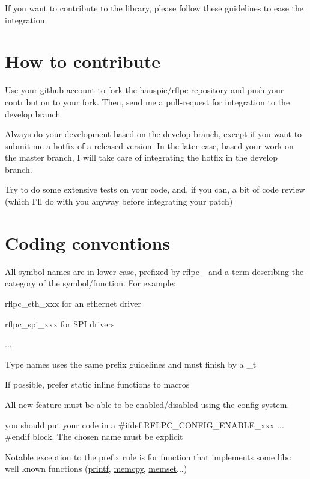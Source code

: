 If you want to contribute to the library, please follow these guidelines to ease the integration\hypertarget{guidelines_contribute}{}\section{How to contribute}\label{guidelines_contribute}

\begin{DoxyItemize}
\item Use your github account to fork the {\ttfamily hauspie/rflpc} repository and push your contribution to your fork. Then, send me a pull-\/request for integration to the {\ttfamily develop} branch
\item Always do your development based on the {\ttfamily develop} branch, except if you want to submit me a hotfix of a released version. In the later case, based your work on the master branch, I will take care of integrating the hotfix in the {\ttfamily develop} branch.
\item Try to do some extensive tests on your code, and, if you can, a bit of code review (which I'll do with you anyway before integrating your patch)
\end{DoxyItemize}\hypertarget{guidelines_conventions}{}\section{Coding conventions}\label{guidelines_conventions}

\begin{DoxyItemize}
\item All symbol names are in lower case, prefixed by {\ttfamily rflpc\-\_\-} and a term describing the category of the symbol/function. For example\-:
\begin{DoxyItemize}
\item {\ttfamily rflpc\-\_\-eth\-\_\-xxx} for an ethernet driver
\item {\ttfamily rflpc\-\_\-spi\-\_\-xxx} for S\-P\-I drivers
\item ...
\end{DoxyItemize}
\item Type names uses the same prefix guidelines and must finish by a {\ttfamily \-\_\-t} 
\item If possible, prefer static inline functions to macros
\item All new feature must be able to be enabled/disabled using the config system.
\begin{DoxyItemize}
\item you should put your code in a {\ttfamily \#ifdef R\-F\-L\-P\-C\-\_\-\-C\-O\-N\-F\-I\-G\-\_\-\-E\-N\-A\-B\-L\-E\-\_\-xxx ... \#endif} block. The chosen name must be explicit
\end{DoxyItemize}
\item Notable exception to the prefix rule is for function that implements some libc well known functions (\hyperlink{group__libc_ga98631211a4a8aee62f572375d5b637be}{printf}, \hyperlink{group__libc_ga14938524dcbeb59d7117ba5e151ad1b1}{memcpy}, \hyperlink{group__libc_ga362b656d9de3289b55b1035d14cb4b5d}{memset}...) 
\end{DoxyItemize}